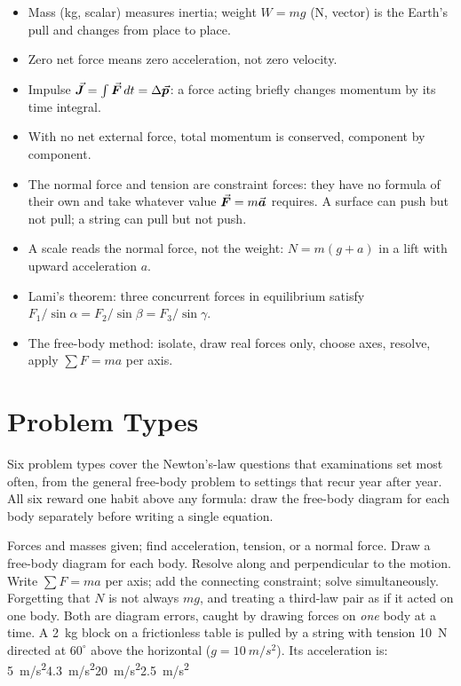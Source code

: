 \begin{itemize}
\item Mass (kg, scalar) measures inertia; weight $W=mg$ (N, vector) is the Earth's pull and changes from place to place.
\item Zero net force means zero acceleration, not zero velocity.
\item Impulse $\vec{\bm{J}}=\int\vec{\bm{F}}\,dt=\Delta\vec{\bm{p}}$: a force acting briefly changes momentum by its time integral.
\item With no net external force, total momentum is conserved, component by component.
\item The normal force and tension are constraint forces: they have no formula of their own and take
      whatever value $\vec{\bm{F}}=m\vec{\bm{a}}$ requires. A surface can push but not pull; a string can pull but not push.
\item A scale reads the normal force, not the weight: $N=m(g+a)$ in a lift with upward acceleration $a$.
\item Lami's theorem: three concurrent forces in equilibrium satisfy $F_1/\sin\alpha=F_2/\sin\beta=F_3/\sin\gamma$.
\item The free-body method: isolate, draw real forces only, choose axes, resolve, apply $\sum F=ma$ per axis.
\end{itemize}

\section{Problem Types}\label{sec:types7}
Six problem types cover the Newton's-law questions that examinations set most often, from the general
free-body problem to settings that recur year after year. All six reward one habit above any formula:
draw the free-body diagram for each body separately before writing a single equation.

{Forces and masses given; find acceleration, tension, or a normal force.}
{Draw a free-body diagram for each body. Resolve along and perpendicular to the motion. Write
$\sum F=ma$ per axis; add the connecting constraint; solve simultaneously.}
{Forgetting that $N$ is not always $mg$, and treating a third-law pair as if it acted on one body. Both
are diagram errors, caught by drawing forces on \emph{one} body at a time.}
{A \SI{2}{kg} block on a frictionless table is pulled by a string with tension \SI{10}{N} directed at
$60^\circ$ above the horizontal ($g=\SI{10}{m/s^2}$). Its acceleration is:}
{\SI{5}{m/s^2}}{\SI{4.3}{m/s^2}}{\SI{20}{m/s^2}}{\SI{2.5}{m/s^2}}

